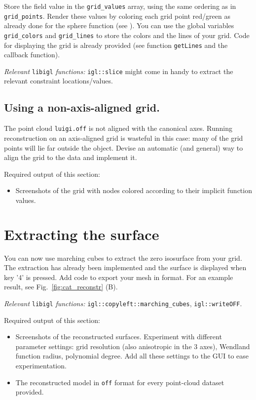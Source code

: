 \documentclass[11pt]{amsart}
\newcommand\pr[1]{\prettyref{#1}}
\begin{document}
Store the field value in the \texttt{grid\_values} array, using the same
ordering as in \texttt{grid\_points}. Render these values by coloring each grid
point red/green as already done for the sphere function (see
\pr{fig:cat_redgreenpts}). You can use the global variables
\texttt{grid\_colors} and \texttt{grid\_lines} to store the colors and the lines
of your grid. Code for displaying the grid is already provided (see function
\texttt{getLines} and the callback function).

\emph{Relevant} \texttt{libigl} \emph{functions: } \texttt{igl::slice} might
come in handy to extract the relevant constraint locations/values.

\subsection{Using a non-axis-aligned grid.}
The point cloud \texttt{luigi.off} is not aligned with the canonical axes.
Running reconstruction on an axis-aligned grid is wasteful in this case: many of
the grid points will lie far outside the object. Devise an automatic (and
general) way to align the grid to the data and implement it.

\vspace{1cm}
Required output of this section:
\begin{itemize}
\item{Screenshots of the grid with nodes colored according to their implicit function values.}
\end{itemize}

\section{Extracting the surface}

You can now use marching cubes to extract the zero isosurface from your grid.
The extraction has already been implemented and the surface is displayed when
key '4' is pressed. Add code to export your mesh in  format. For an
example result, see Fig.~\ref{fig:cat_reconstr} (B).

\emph{Relevant} \texttt{libigl} \emph{functions: } \texttt{igl::copyleft::marching\_cubes}, \texttt{igl::writeOFF}.

\vspace{1cm}
Required output of this section:
\begin{itemize}
\item{Screenshots of the reconstructed surfaces. Experiment with different
    parameter settings: grid resolution (also anisotropic in the 3 axes),
    Wendland function radius, polynomial degree. Add all these settings to the
        GUI to ease experimentation.}
\item{The reconstructed model in \texttt{off} format for every point-cloud
    dataset provided.}
\end{itemize}
\end{document}

